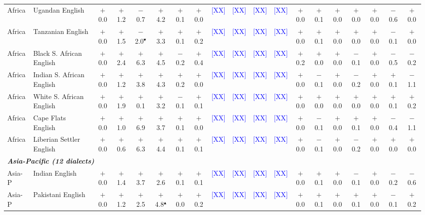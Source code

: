 \begin{table}[t]
\begin{tabular}{llccccccccccccccccc}
Africa & Ugandan English & $+$0.0 & $+$1.2 & $-$0.7 & $+$4.2 & $+$0.1 & $+$0.0 & \textcolor{blue}{[XX]} & \textcolor{blue}{[XX]} & \textcolor{blue}{[XX]} & \textcolor{blue}{[XX]} & $+$0.0 & $+$0.1 & $+$0.0 & $+$0.0 & $+$0.0 & $-$0.6 & $+$0.0 \\
Africa & Tanzanian English & $+$0.0 & $+$1.5 & $-$2.0$^\blacktriangledown$ & $+$3.3 & $+$0.1 & $+$0.2 & \textcolor{blue}{[XX]} & \textcolor{blue}{[XX]} & \textcolor{blue}{[XX]} & \textcolor{blue}{[XX]} & $+$0.0 & $+$0.1 & $+$0.0 & $+$0.0 & $+$0.0 & $-$0.1 & $+$0.0 \\
Africa & Black S. African English & $+$0.0 & $+$2.4 & $+$6.3 & $+$4.5 & $-$0.2 & $+$0.4 & \textcolor{blue}{[XX]} & \textcolor{blue}{[XX]} & \textcolor{blue}{[XX]} & \textcolor{blue}{[XX]} & $+$0.2 & $+$0.0 & $+$0.0 & $-$0.1 & $+$0.0 & $-$0.5 & $-$0.2 \\
Africa & Indian S. African English & $+$0.0 & $+$1.2 & $+$3.8 & $+$4.3 & $+$0.2 & $+$0.0 & \textcolor{blue}{[XX]} & \textcolor{blue}{[XX]} & \textcolor{blue}{[XX]} & \textcolor{blue}{[XX]} & $+$0.0 & $-$0.1 & $+$0.0 & $-$0.2 & $+$0.0 & $+$0.1 & $-$1.1 \\
Africa & White S. African English & $+$0.0 & $+$1.9 & $+$0.1 & $+$3.2 & $-$0.1 & $+$0.1 & \textcolor{blue}{[XX]} & \textcolor{blue}{[XX]} & \textcolor{blue}{[XX]} & \textcolor{blue}{[XX]} & $+$0.0 & $+$0.0 & $+$0.0 & $+$0.0 & $+$0.0 & $+$0.1 & $+$0.2 \\
Africa & Cape Flats English & $+$0.0 & $+$1.0 & $+$6.9 & $+$3.7 & $+$0.1 & $+$0.0 & \textcolor{blue}{[XX]} & \textcolor{blue}{[XX]} & \textcolor{blue}{[XX]} & \textcolor{blue}{[XX]} & $+$0.0 & $-$0.1 & $+$0.0 & $+$0.1 & $+$0.0 & $-$0.4 & $-$1.1 \\
Africa & Liberian Settler English & $+$0.0 & $+$0.6 & $+$6.3 & $+$4.4 & $+$0.1 & $+$0.1 & \textcolor{blue}{[XX]} & \textcolor{blue}{[XX]} & \textcolor{blue}{[XX]} & \textcolor{blue}{[XX]} & $+$0.0 & $-$0.1 & $+$0.0 & $-$0.2 & $+$0.0 & $+$0.0 & $+$0.0 \\
\midrule
\multicolumn{19}{l}{\textit{\textbf{Asia-Pacific (12 dialects)}}} \\
Asia-P & Indian English & $+$0.0 & $+$1.4 & $+$3.7 & $+$2.6 & $+$0.1 & $+$0.1 & \textcolor{blue}{[XX]} & \textcolor{blue}{[XX]} & \textcolor{blue}{[XX]} & \textcolor{blue}{[XX]} & $+$0.0 & $+$0.1 & $+$0.0 & $-$0.1 & $+$0.0 & $-$0.2 & $-$0.6 \\
Asia-P & Pakistani English & $+$0.0 & $+$1.2 & $+$2.5 & $+$4.8$^\blacktriangle$ & $+$0.0 & $+$0.2 & \textcolor{blue}{[XX]} & \textcolor{blue}{[XX]} & \textcolor{blue}{[XX]} & \textcolor{blue}{[XX]} & $+$0.0 & $+$0.1 & $+$0.0 & $+$0.1 & $+$0.0 & $-$0.1 & $+$0.2 \\

\end{tabular}
\end{table}
